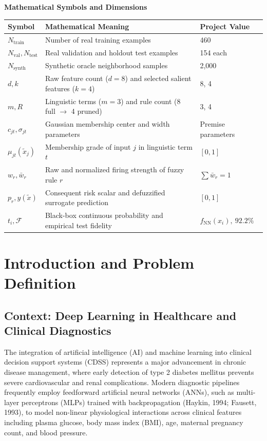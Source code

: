 \documentclass{report}
\begin{document}
{\vspace{0.15cm}
\begin{center}
{\fontsize{11}{14}\selectfont \bfseries Mathematical Symbols and Dimensions}\\[0.15cm]
\footnotesize
\begin{tabularx}{\textwidth}{l X l}
\toprule
\textbf{Symbol} & \textbf{Mathematical Meaning} & \textbf{Project Value} \\
\midrule
$N_{\text{train}}$ & Number of real training examples & 460 \\
$N_{\text{val}}, N_{\text{test}}$ & Real validation and holdout test examples & 154 each \\
$N_{\text{synth}}$ & Synthetic oracle neighborhood samples & 2,000 \\
$d, k$ & Raw feature count ($d=8$) and selected salient features ($k=4$) & 8, 4 \\
$m, R$ & Linguistic terms ($m=3$) and rule count (8 full $\to$ 4 pruned) & 3, 4 \\
$c_{jt}, \sigma_{jt}$ & Gaussian membership center and width parameters & Premise parameters \\
$\mu_{jt}(\tilde{x}_j)$ & Membership grade of input $j$ in linguistic term $t$ & $[0, 1]$ \\
$w_r, \bar{w}_r$ & Raw and normalized firing strength of fuzzy rule $r$ & $\sum \bar{w}_r = 1$ \\
$p_r, y(\tilde{x})$ & Consequent risk scalar and defuzzified surrogate prediction & $[0, 1]$ \\
$t_i, \mathcal{F}$ & Black-box continuous probability and empirical test fidelity & $f_{\text{NN}}(x_i), \ 92.2\%$ \\
\bottomrule
\end{tabularx}
\end{center}
}

\clearpage
{}
\pagestyle{fancy}


\chapter{Introduction and Problem Definition}

\section{Context: Deep Learning in Healthcare and Clinical Diagnostics}

The integration of artificial intelligence (AI) and machine learning into clinical decision support systems (CDSS) represents a major advancement in chronic disease management, where early detection of type 2 diabetes mellitus prevents severe cardiovascular and renal complications. Modern diagnostic pipelines frequently employ feedforward artificial neural networks (ANNs), such as multi-layer perceptrons (MLPs) trained with backpropagation (Haykin, 1994; Fausett, 1993), to model non-linear physiological interactions across clinical features including plasma glucose, body mass index (BMI), age, maternal pregnancy count, and blood pressure.
\end{document}
